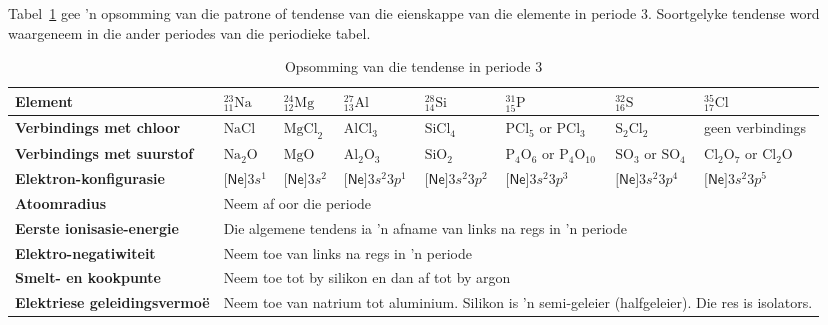 
 Tabel~\ref{tab:period3trends} gee 'n opsomming van die patrone of tendense van die eienskappe van die elemente in periode 3. Soortgelyke tendense word waargeneem in die ander periodes van die periodieke tabel. \\
\begin{table}[H]
 \begin{center}
  \begin{tabular}{|p{2cm}|p{1cm}|p{1cm}|p{1.4cm}|p{1.4cm}|p{1.4cm}|p{1.4cm}|p{1.4cm}|} \hline
\textbf{Element} & $^{23}_{11}\text{Na}$ & $^{24}_{12}\text{Mg}$ &  $^{27}_{13}\text{Al}$ & $^{28}_{14}\text{Si}$ &  $^{31}_{15}\text{P}$ & $^{32}_{16}\text{S}$ & $^{35}_{17}\text{Cl}$ \\ \hline
   \textbf{Verbindings met chloor} & $\text{NaCl}$ & $\text{MgCl}_2$ & $\text{AlCl}_{3}$ & $\text{SiCl}_{4}$ & $\text{PCl}_{5}$ or $\text{PCl}_{3}$ & $\text{S}_{2}\text{Cl}_{2}$ & geen verbindings  \\ \hline
\textbf{Verbindings met suurstof} & $\text{Na}_{2}\text{O}$ & $\text{MgO}$ & $\text{Al}_{2}\text{O}_{3}$ & $\text{SiO}_{2}$ & $\text{P}_{4}\text{O}_{6}$ or $\text{P}_{4}\text{O}_{10}$ & $\text{SO}_{3}$ or $\text{SO}_{4}$ & $\text{Cl}_{2}\text{O}_{7}$ or $\text{Cl}_{2}\text{O}$  \\ \hline
\textbf{Elektron-konfigurasie} & $\textsf{[Ne]}3s^{1}$ & $\textsf{[Ne]}3s^{2}$ & $\textsf{[Ne]}3s^{2}3p^{1}$ & $\textsf{[Ne]}3s^{2}3p^{2}$ & $\textsf{[Ne]}3s^{2}3p^{3}$ & $\textsf{[Ne]}3s^{2}3p^{4}$ & $\textsf{[Ne]}3s^{2}3p^{5}$ \\ \hline
\textbf{Atoomradius} & \multicolumn{7}{p{8cm}|}{Neem af oor die periode} \\ \hline
\textbf{Eerste ionisasie-energie} & \multicolumn{7}{p{8cm}|}{Die algemene tendens ia  'n afname van links na regs in  'n periode} \\ \hline
\textbf{Elektro-negatiwiteit} & \multicolumn{7}{p{8cm}|}{Neem toe van links na regs in  'n periode} \\ \hline
\textbf{Smelt- en kookpunte} & \multicolumn{7}{p{8cm}|}{Neem toe tot by silikon en dan af tot by argon} \\ \hline
\textbf{Elektriese geleidingsvermo\"{e}} & \multicolumn{7}{p{10cm}|}{Neem toe van natrium tot aluminium. Silikon is  'n semi-geleier (halfgeleier). Die res is isolators. } \\ \hline
  \end{tabular}
\caption{Opsomming van die tendense in periode 3}
\label{tab:period3trends}
 \end{center}

\end{table}
